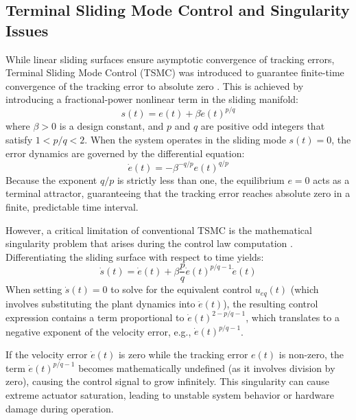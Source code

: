 \subsection{Terminal Sliding Mode Control and Singularity Issues}
While linear sliding surfaces ensure asymptotic convergence of tracking errors, Terminal Sliding Mode Control (TSMC) was introduced to guarantee finite-time convergence of the tracking error to absolute zero \cite{ref_19, ref_33}. This is achieved by introducing a fractional-power nonlinear term in the sliding manifold:
\begin{equation}
s(t) = e(t) + \beta \dot{e}(t)^{p/q}
\end{equation}
where $\beta > 0$ is a design constant, and $p$ and $q$ are positive odd integers that satisfy $1 < p/q < 2$. When the system operates in the sliding mode $s(t) = 0$, the error dynamics are governed by the differential equation:
\begin{equation}
\dot{e}(t) = -\beta^{-q/p} e(t)^{q/p}
\end{equation}
Because the exponent $q/p$ is strictly less than one, the equilibrium $e = 0$ acts as a terminal attractor, guaranteeing that the tracking error reaches absolute zero in a finite, predictable time interval.

However, a critical limitation of conventional TSMC is the mathematical singularity problem that arises during the control law computation \cite{ref_26, ref_31}. Differentiating the sliding surface with respect to time yields:
\begin{equation}
\dot{s}(t) = \dot{e}(t) + \beta \frac{p}{q} \dot{e}(t)^{p/q - 1} \ddot{e}(t)
\end{equation}
When setting $\dot{s}(t) = 0$ to solve for the equivalent control $u_{eq}(t)$ (which involves substituting the plant dynamics into $\ddot{e}(t)$), the resulting control expression contains a term proportional to $\dot{e}(t)^{2 - p/q - 1}$, which translates to a negative exponent of the velocity error, e.g., $\dot{e}(t)^{p/q - 1}$. 

If the velocity error $\dot{e}(t)$ is zero while the tracking error $e(t)$ is non-zero, the term $\dot{e}(t)^{p/q - 1}$ becomes mathematically undefined (as it involves division by zero), causing the control signal to grow infinitely. This singularity can cause extreme actuator saturation, leading to unstable system behavior or hardware damage during operation.

